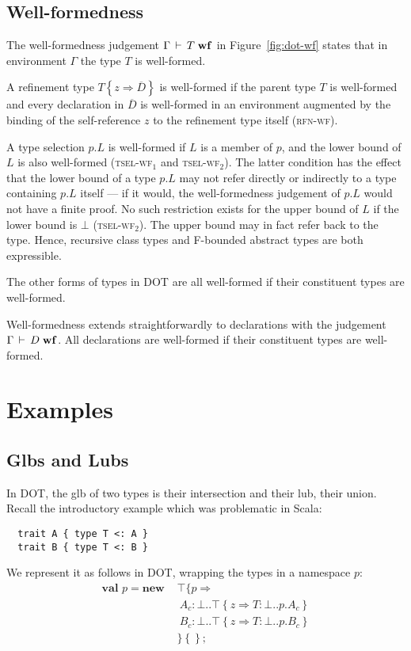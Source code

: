 \documentclass[9pt]{sigplanconf}
\newcommand{\figref}[1]
        {Figure~\ref{fig:#1}}
\newcommand{\ts}{\,\vdash\,}
\newcommand{\wf}{\;\mbox{\textbf{wf}}}
\newcommand{\refine}[2]{\left\{#1 \Rightarrow #2 \right\}}
\newcommand{\mlrefine}[2]{\{#1 \Rightarrow #2 \}}
\newcommand{\ldefs}[1]{\left\{#1\right\}}
\newcommand{\seq}[1]{\overline{#1}}
\newcommand{\mlnew}[3]{\textbf{val }#1 = \textbf{new }#2 ;\;\\&#3}
\newcommand{\Ldecl}[3]{#1 : #2..#3}%
\newcommand{\Top}{\top}%
\newcommand{\Bot}{\bot}%
\begin{document}
\subsection{Well-formedness}

The well-formedness judgement $\Gamma \ts T \wf$ in \figref{dot-wf}
states that in environment $\Gamma$ the type $T$ is
well-formed.

A refinement type $T \refine z {\seq D}$ is
well-formed if the parent type $T$ is well-formed and every
declaration in $\seq D$ is well-formed in an environment augmented by
the binding of the self-reference $z$ to the refinement type itself
(\textsc{rfn-wf}).

A type selection $p.L$ is well-formed if $L$ is a member of $p$, and
the lower bound of $L$ is also well-formed (\textsc{tsel-wf$_1$} and
\textsc{tsel-wf$_2$}). The latter condition has the effect that the
lower bound of a type $p.L$ may not refer directly or indirectly to a
type containing $p.L$ itself --- if it would, the well-formedness
judgement of $p.L$ would not have a finite proof. No such restriction
exists for the upper bound of $L$ if the lower bound is $\bot$
(\textsc{tsel-wf$_2$}). The upper bound may in fact refer back to the
type. Hence, recursive class types and F-bounded abstract types are
both expressible.

The other forms of types in DOT are all well-formed if their
constituent types are well-formed.

Well-formedness extends straightforwardly to declarations with the
judgement $\Gamma \ts D \wf$. All declarations are well-formed if
their constituent types are well-formed.

\section{Examples}\label{dot-examples}

\subsection{Glbs and Lubs}\label{ex-exp}

In DOT, the glb of two types is their intersection and their lub,
their union. Recall the introductory example which was problematic in
Scala:
\begin{lstlisting}
  trait A { type T <: A }
  trait B { type T <: B }
\end{lstlisting}

We represent it as follows in DOT, wrapping the types in a namespace $p$:
\begin{align*}
\mlnew p {&\Top \mlrefine p {\\
&\ \Ldecl {A_c} \Bot {\Top \refine z {\Ldecl T \Bot {p.A_c}}}\\
&\ \Ldecl {B_c} \Bot {\Top \refine z {\Ldecl T \Bot {p.B_c}}}\\
&}\ldefs{}}{}
\end{align*}
\end{document}
